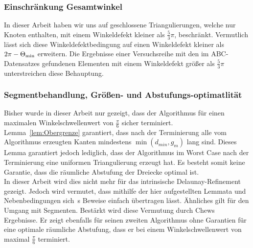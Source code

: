 \subsubsection{Einschränkung Gesamtwinkel}
In dieser Arbeit haben wir uns auf geschlossene Triangulierungen, welche nur Knoten enthalten, mit einem Winkeldefekt kleiner als $ \frac{5}{3}\pi$, beschränkt. Vermutlich lässt sich diese Winkeldefektbedingung auf  einen Winkeldefekt kleiner als $2\pi - \kleinsterWinkel*$ erweitern. 
Die Ergebnisse einer Versuchsreihe mit den im  ABC-Datensatzes gefundenen Elementen  mit einem Winkeldefekt größer als $\frac{5}{3}\pi$   unterstreichen diese Behauptung.
 


\subsubsection{Segmentbehandlung, Größen- und Abstufungs-optimatlität}
Bisher wurde in dieser Arbeit nur gezeigt, dass der Algorithmus für einen maximalen Winkelschwellenwert von  $\frac{\pi}{6}$ sicher terminiert. Lemma~\ref{lem:Obergrenze} garantiert, dass nach der Terminierung alle vom Algorithmus erzeugten Kanten mindestens $\min(d_{min},g_{m})$ lang sind. Dieses Lemma garantiert jedoch lediglich, dass der Algorithmus im Worst Case nach der Terminierung eine uniformen Triangulierung erzeugt hat. Es besteht somit keine Garantie, dass die räumliche Abstufung der Dreiecke optimal ist.\\
In dieser Arbeit wird dies nicht mehr für das intrinsische Delaunay-Refinement gezeigt. Jedoch wird vermutet, dass mithilfe der hier aufgestellten Lemmata und Nebenbedingungen sich~\citeauthor{ruppert:1995:delaunay}s Beweise einfach übertragen lässt. Ähnliches gilt für den Umgang mit Segmenten. Bestärkt wird diese Vermutung durch Chews~\cite{chew:1993:guaranteed} Ergebnisse. Er zeigt ebenfalls für seinen zweiten Algorithmus ohne Garantien für eine optimale  räumliche Abstufung, dass er bei einem Winkelschwellenwert von maximal $\frac{\pi}{6}$ terminiert.

 

